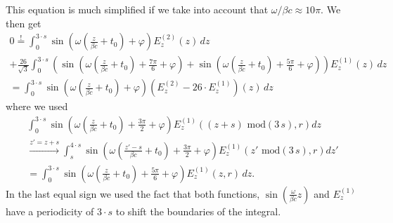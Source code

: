 \documentclass[automark,a4paper,11pt,headsepline]{scrartcl}
\begin{document}
This equation is much simplified if we take into account that $\omega / \beta c \approx 10\pi$. We then get
\begin{multline*}
0 \stackrel{!}{=} \int_{0}^{3\cdot s} \sin\left(\omega \left(\frac{z}{\beta c} + t_{0}\right) + \varphi\right) E_z^{(2)}(z)\, dz \\
                + \frac{26}{\sqrt{3}} \int_{0}^{3\cdot s}\left(\sin\left(\omega \left(\frac{z}{\beta c} + t_{0}\right) + \frac{7\pi}{6} + \varphi \right) 
                                                        + \sin\left(\omega \left(\frac{z}{\beta c} + t_{0}\right) + \frac{5\pi}{6} + \varphi \right)\right) E_z^{(1)}(z)\, dz \\
       = \int_{0}^{3\cdot s}\sin\left(\omega \left(\frac{z}{\beta c} + t_{0}\right) + \varphi\right) \left(E_z^{(2)} - 26\cdot E_z^{(1)}\right)(z)\,dz
\end{multline*}
where we used
\begin{multline*}
\int_{0}^{3\cdot s} \sin\left(\omega \left(\frac{z}{\beta c} + t_{0}\right) + \frac{3\pi}{2} + \varphi\right) E_z^{(1)}((z + s) \text{ mod}(3\,s),r) dz \\
\stackrel{z' = z + s}{\longrightarrow} \int_{s}^{4\cdot s} \sin\left(\omega \left(\frac{z'-s}{\beta c} + t_{0} \right) + \frac{3\pi}{2} + \varphi\right)E_z^{(1)}(z' \text{ mod}(3\,s),r)dz' \\ 
= \int_{0}^{3\cdot s} \sin\left(\omega \left(\frac{z}{\beta c} + t_{0}\right) + \frac{5\pi}{6} + \varphi\right) E_z^{(1)}(z,r)\,dz.
\end{multline*}
In the last equal sign we used the fact that both functions, $\sin(\frac{\omega}{\beta c}z)$ and $E_z^{(1)}$ have a periodicity of $3\cdot s$ to shift the boundaries of the integral.
\end{document}
